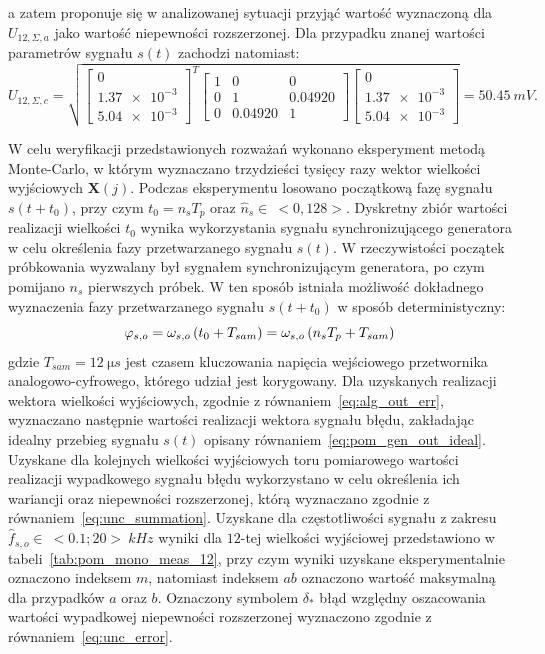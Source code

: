a zatem proponuje się w analizowanej sytuacji przyjąć wartość wyznaczoną dla $U_{12,\Sigma,a}$ jako wartość niepewności rozszerzonej. Dla przypadku znanej wartości parametrów sygnału $s(t)$ zachodzi natomiast:
\begin{equation}
U_{12,\Sigma,c} = \sqrt{
\begin{bmatrix}
0 \\ \num{1.37e-3} \\ \num{5.04e-3}
\end{bmatrix}^{T}
\begin{bmatrix}
1       &       0 &       0 \\
0       &       1 & 0.04920 \\
0       & 0.04920 &       1
\end{bmatrix}
\begin{bmatrix}
0 \\ \num{1.37e-3} \\ \num{5.04e-3}
\end{bmatrix}} = \qty{50.45}{mV}
\label{eq:pom_mono_all_unc_c}.
\end{equation}

W celu weryfikacji przedstawionych rozważań wykonano eksperyment metodą Monte-Carlo, w którym wyznaczano trzydzieści tysięcy razy wektor wielkości wyjściowych $\mathbf{X}(j)$. Podczas eksperymentu losowano początkową fazę sygnału $s(t+t_{0})$, przy czym $t_{0} = n_{s} T_{p}$ oraz $\hat{n}_{s} \in~<0,128>$. Dyskretny zbiór wartości realizacji wielkości $t_{0}$ wynika wykorzystania sygnału synchronizującego generatora w celu określenia fazy przetwarzanego sygnału $s(t)$. W rzeczywistości początek próbkowania wyzwalany był sygnałem synchronizującym generatora, po czym pomijano $n_{s}$ pierwszych próbek. W ten sposób istniała możliwość dokładnego wyznaczenia fazy przetwarzanego sygnału $s(t+t_{0})$ w sposób deterministyczny:
\begin{equation}
\varphi_{s,o} = \omega_{s,o} \left(t_{0} + T_{sam}\right) = \omega_{s,o} \left(n_{s} T_{p} + T_{sam}\right) \label{eq:pom_mono_delay}
\end{equation}
gdzie $T_{sam} = \qty{12}{\micro s}$ jest czasem kluczowania napięcia wejściowego przetwornika analogowo-cyfrowego, którego udział jest korygowany. Dla uzyskanych realizacji wektora wielkości wyjściowych, zgodnie z równaniem~\eqref{eq:alg_out_err}, wyznaczano następnie wartości realizacji wektora sygnału błędu, zakładając idealny przebieg sygnału $s(t)$ opisany równaniem~\eqref{eq:pom_gen_out_ideal}. Uzyskane dla kolejnych wielkości wyjściowych toru pomiarowego wartości realizacji wypadkowego sygnału błędu wykorzystano w celu określenia ich wariancji oraz niepewności rozszerzonej, którą wyznaczano zgodnie z równaniem~\eqref{eq:unc_summation}. Uzyskane dla częstotliwości sygnału z zakresu $\hat{f}_{s,o} \in~<0.1;20>~\unit{kHz}$ wyniki dla $12$-tej wielkości wyjściowej przedstawiono w tabeli~\ref{tab:pom_mono_meas_12}, przy czym wyniki uzyskane eksperymentalnie oznaczono indeksem $m$, natomiast indeksem $ab$ oznaczono wartość maksymalną dla przypadków $a$ oraz $b$. Oznaczony symbolem $\delta_{*}$ błąd względny oszacowania wartości wypadkowej niepewności rozszerzonej wyznaczono zgodnie z równaniem~\eqref{eq:unc_error}.


